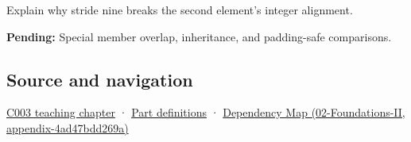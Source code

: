 Explain why stride nine breaks the second element's integer alignment.

\textbf{Pending:} Special member overlap, inheritance, and padding-safe comparisons.

\subsection{Source and navigation}\label{appendix-f52f8c5a3afd-source-and-navigation}

\hyperref[01-foundations-i-ch002-where-the-bytes-live]{C003 teaching chapter} · \hyperref[appendix-fd090d982a15-m003---parts-41-60]{Part definitions} · \href{../02-Foundations-II/main.pdf\#nameddest=appendix-4ad47bdd269a}{Dependency Map (02-Foundations-II, appendix-4ad47bdd269a)}
